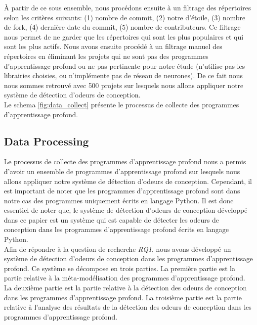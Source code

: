 À partir de ce sous ensemble, nous procédons ensuite à un filtrage des répertoires selon les
critères suivants: (1) nombre de commit, (2) notre d'étoile, (3) nombre de fork, (4) dernière date du
commit, (5) nombre de contributeurs. Ce filtrage nous permet de ne garder que
les répertoires qui sont les plus populaires et qui sont les plus actifs. Nous
avons ensuite procédé à un filtrage manuel des répertoires en éliminant les
projets qui ne sont pas des programmes d'apprentissage profond ou ne pas
pertinente pour notre étude (n'utilise pas les librairies choisies, ou
n'implémente pas de réseau de neurones). De ce fait nous nous sommes retrouvé
avec 500 projets sur lesquels nous allons appliquer notre système de détection
d'odeurs de conception.\\ Le schema \ref{fig:data_collect} présente le processus
de collecte des programmes d'apprentissage profond.\\








\subsection{Data Processing}
\label{sec:Data Processing}
Le processus de collecte des programmes d'apprentissage profond nous a permis
d'avoir un ensemble de programmes d'apprentissage profond sur lesquels nous
allons appliquer notre système de détection d'odeurs de conception. Cependant,
il est important de noter que les programmes d'apprentissage profond sont dans
notre cas des programmes uniquement écrits en langage Python. Il est donc
essentiel de noter que, le système de détection d'odeurs de conception développé
dans ce papier est un système qui est capable de détecter les odeurs de
conception dans les programmes d'apprentissage profond écrits en langage
Python.\\

Afin de répondre à la question de recherche \emph{RQ1}, nous avons développé un système de détection d'odeurs de
conception dans les programmes d'apprentissage profond. Ce système se décompose
en trois parties. La première partie est la partie relative à la
méta-modélisation des programmes d'apprentissage profond. La
deuxième partie est la partie relative à la détection des odeurs de conception
dans les programmes d'apprentissage profond. La troisième partie est la partie
relative à l'analyse des résultats de la détection des odeurs de conception dans
les programmes d'apprentissage profond.

